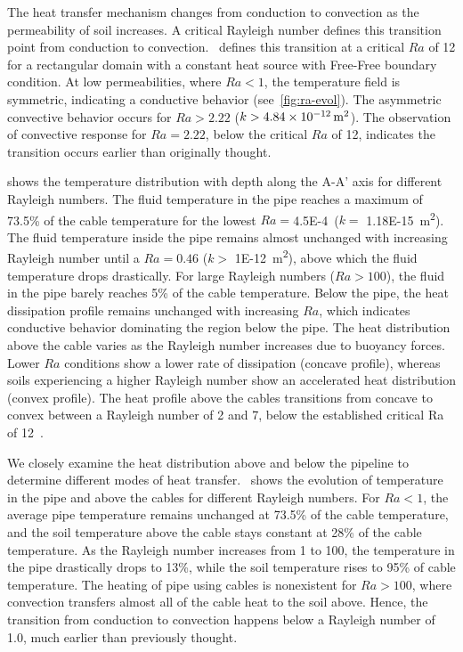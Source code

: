 \documentclass[Journal,letterpaper,InsideFigs]{ascelike-new}
\begin{document}
The heat transfer mechanism changes from conduction to convection as the permeability of soil increases. A critical Rayleigh number defines this transition point from conduction to convection.~ defines this transition at a critical $Ra$ of 12 for a rectangular domain with a constant heat source with Free-Free boundary condition. At low permeabilities, where $Ra < 1$, the temperature field is symmetric, indicating a conductive behavior (see~\cref{fig:ra-evol}). The asymmetric convective behavior occurs for $Ra > 2.22$ ($k > \SI{4.84E-12}{\meter\squared}$). The observation of convective response for $Ra = 2.22$, below the critical $Ra$ of 12, indicates the transition occurs earlier than originally thought. 

 shows the temperature distribution with depth along the A-A' axis for different Rayleigh numbers. The fluid temperature in the pipe reaches a maximum of 73.5\% of the cable temperature for the lowest $Ra = $\SI{4.5E-4} ($k =$ \SI{1.18E-15}{\meter\squared}). The fluid temperature inside the pipe remains almost unchanged with increasing Rayleigh number until a $Ra = 0.46$ ($k >$ \SI{1E-12}{\meter\squared}), above which the fluid temperature drops drastically. For large Rayleigh numbers ($Ra > 100$), the fluid in the pipe barely reaches 5\% of the cable temperature. Below the pipe, the heat dissipation profile remains unchanged with increasing $Ra$, which indicates conductive behavior dominating the region below the pipe. The heat distribution above the cable varies as the Rayleigh number increases due to buoyancy forces. Lower $Ra$ conditions show a lower rate of dissipation (concave profile), whereas soils experiencing a higher Rayleigh number show an accelerated heat distribution (convex profile). The heat profile above the cables transitions from concave to convex between a Rayleigh number of 2 and 7, below the established critical Ra of 12~\cite{nield1968onset}. 

We closely examine the heat distribution above and below the pipeline to determine different modes of heat transfer.~ shows the evolution of temperature in the pipe and above the cables for different Rayleigh numbers. For $Ra < 1$, the average pipe temperature remains unchanged at 73.5\% of the cable temperature, and the soil temperature above the cable stays constant at 28\% of the cable temperature. As the Rayleigh number increases from 1 to 100, the temperature in the pipe drastically drops to 13\%, while the soil temperature rises to 95\% of cable temperature. The heating of pipe using cables is nonexistent for $Ra > 100$, where convection transfers almost all of the cable heat to the soil above. Hence, the transition from conduction to convection happens below a Rayleigh number of 1.0, much earlier than previously thought.
\end{document}
